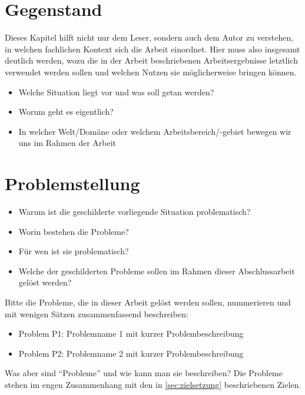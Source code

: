 \documentclass[headsepline,titlepage,twoside,12pt]{report}
\begin{document}
\section{Gegenstand}
Dieses Kapitel hilft nicht nur dem Leser, sondern auch dem Autor zu verstehen, in welchen fachlichen Kontext sich die Arbeit einordnet.
Hier muss also insgesamt deutlich werden, wozu die in der Arbeit beschriebenen Arbeitsergebnisse letztlich verwendet werden sollen und welchen Nutzen sie möglicherweise bringen können.

\begin{itemize}
\item Welche Situation liegt vor und was soll getan werden?
\item Worum geht es eigentlich?
\item In welcher Welt/Domäne oder welchem Arbeitsbereich/-gebiet bewegen wir uns im Rahmen der Arbeit
\end{itemize}

\section{Problemstellung}
\begin{itemize}
\item Warum ist die geschilderte vorliegende Situation problematisch?
\item Worin bestehen die Probleme?
\item Für wen ist sie problematisch?
\item Welche der geschilderten Probleme sollen im Rahmen dieser Abschlussarbeit gelöst werden?
\end{itemize}

Bitte die Probleme, die in dieser Arbeit gelöst werden sollen, nummerieren und mit wenigen Sätzen zusammenfassend beschreiben:

\begin{itemize}
\item Problem P1: Problemname 1 mit kurzer Problembeschreibung
\item Problem P2: Problemname 2 mit kurzer Problembeschreibung
\end{itemize}

Was aber sind \enquote{Probleme} und wie kann man sie beschreiben?
Die Probleme stehen im engen Zusammenhang mit den in \cref{sec:zielsetzung} beschriebenen Zielen.
\end{document}
